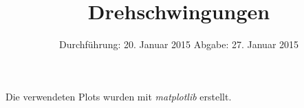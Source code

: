 
\usepackage{marvosym}
\subject{Anfängerpraktikum V102}
\title{Drehschwingungen
}
\date{
  Durchführung: 20. Januar 2015
  \hspace{1em}
  Abgabe: 27. Januar 2015
}


\maketitle
\newpage





\printbibliography
\noindent Die verwendeten Plots wurden mit \textit{matplotlib}\cite{matplotlib} erstellt.

